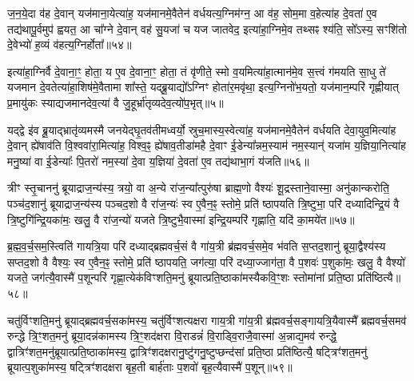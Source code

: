 ज॒न॒ये॒दा व॑ह दे॒वान् यज॑माना॒येत्या॑ह॒ यज॑मानमे॒वैतेन॑ वर्धयत्य॒ग्निम॑ग्न॒ आ व॑ह॒ सोम॒मा व॒हेत्या॑ह दे॒वता॑ ए॒व तद्य॑थापू॒र्वमुप॑ ह्वयत॒ आ चा᳚ग्ने दे॒वान् वह॑ सु॒यजा॑ च यज जातवेद॒ इत्या॑हा॒ग्निमे॒व तथ्सꣴ श्य॑ति॒ सो᳚\-ऽस्य॒ सꣳशि॑तो दे॒वेभ्यो॑ ह॒व्यं व॑हत्य॒ग्निर्\mbox{}होता᳚॥५४॥

इत्या॑हा॒ग्निर्वै दे॒वाना॒ꣳ॒ होता॒ य ए॒व दे॒वाना॒ꣳ॒ होता॒ तं वृ॑णीते॒ स्मो व॒यमित्या॑हा॒त्मान॑मे॒व स॒त्त्वं ग॑मयति सा॒धु ते॑ यजमान दे॒वतेत्या॑हा॒शिष॑मे॒वैतामा शा᳚स्ते॒ यद्ब्रू॒याद्यो᳚\-ऽग्निꣳ होता॑र॒मवृ॑था॒ इत्य॒ग्निनो॑भ॒यतो॒ यज॑मान॒म्परि॑ गृह्णीयात् प्र॒मायु॑कः स्याद्यजमानदेव॒त्या॑ वै जु॒हूर्भ्रा॑तृव्यदेव॒त्यो॑प॒भृत्॥५॥

यद्द्वे इ॑व ब्रू॒याद्भ्रातृ॑व्यमस्मै जनयेद्घृ॒तव॑तीमध्वर्यो॒ स्रुच॒मास्य॒स्वेत्या॑ह॒ यज॑मानमे॒वैतेन॑ वर्धयति देवा॒युव॒मित्या॑ह दे॒वान् ह्ये॑षाव॑ति वि॒श्ववा॑रा॒मित्या॑ह॒ विश्व॒ꣴ॒ ह्ये॑षाव॒तीडा॑महै दे॒वाꣳ ई॒डेन्या᳚न्नम॒स्याम॑ नम॒स्यान्॑ यजा॑म य॒ज्ञिया॒नित्या॑ह मनु॒ष्या॑ वा ई॒डेन्याः᳚ पि॒तरो॑ नम॒स्या॑ दे॒वा य॒ज्ञिया॑ दे॒वता॑ ए॒व तद्य॑थाभा॒गं य॑जति॥५६॥

{\anuvakamend[{विप्रा॑नुमदित॒ इत्या॑ह च॒नास्मै॒ होतो॑प॒भृद्दे॒वता॑ ए॒व त्रीणि॑ च॥९॥}]}

त्रीꣳ स्तृ॒चाननु॑ ब्रूयाद्राज॒न्य॑स्य॒ त्रयो॒ वा अ॒न्ये रा॑ज॒न्या᳚त्पुरु॑षा ब्राह्म॒णो वैश्यः॑ शू॒द्रस्ताने॒वास्मा॒ अनु॑कान्करोति॒ पञ्च॑द॒शानु॑ ब्रूयाद्राज॒न्य॑स्य पञ्चद॒शो वै रा॑ज॒न्यः॑ स्व ए॒वैन॒ꣴ॒ स्तोमे॒ प्रति॑ ष्ठापयति त्रि॒ष्टुभा॒ परि॑ दध्यादिन्द्रि॒यं वै त्रि॒ष्टुगि॑न्द्रि॒यका॑मः॒ खलु॒ वै रा॑ज॒न्यो॑ यजते त्रि॒ष्टुभै॒वास्मा॑ इन्द्रि॒यम्परि॑ गृह्णाति॒ यदि॑ का॒मये॑त॥५७॥

ब्र॒ह्म॒व॒र्च॒सम॒स्त्विति॑ गायत्रि॒या परि॑ दध्याद्ब्रह्मवर्च॒सं वै गा॑य॒त्री ब्र॑ह्मवर्च॒समे॒व भ॑वति स॒प्तद॒शानु॑ ब्रूया॒द्वैश्य॑स्य सप्तद॒शो वै वैश्यः॒ स्व ए॒वैन॒ꣴ॒ स्तोमे॒ प्रति॑ ष्ठापयति॒ जग॑त्या॒ परि॑ दध्या॒ज्जाग॑ता॒ वै प॒शवः॑ प॒शुका॑मः॒ खलु॒ वै वैश्यो॑ यजते॒ जग॑त्यै॒वास्मै॑ प॒शून्परि॑ गृह्णा॒त्येक॑विꣳशति॒मनु॑ ब्रूयात्प्रति॒ष्ठाका॑मस्यैकवि॒ꣳ॒शः स्तोमा॑नां प्रति॒ष्ठा प्रति॑ष्ठित्यै॥५८॥

चतु॑र्विꣳशति॒मनु॑ ब्रूयाद्ब्रह्मवर्च॒सका॑मस्य॒ चतु॑र्विꣳशत्यक्षरा गाय॒त्री गा॑य॒त्री ब्र॑ह्मवर्च॒सङ्गायत्रि॒यैवास्मै᳚ ब्रह्मवर्च॒समव॑ रुन्द्धे त्रि॒ꣳ॒शत॒मनु॑ ब्रूया॒दन्न॑कामस्य त्रि॒ꣳ॒शद॑क्षरा वि॒राडन्नं॑ वि॒राड्वि॒राजै॒वास्मा॑ अ॒न्नाद्य॒मव॑ रुन्द्धे॒ द्वात्रिꣳ॑शत॒मनु॑ब्रूयात्प्रति॒ष्ठाका॑मस्य॒ द्वात्रिꣳ॑शदक्षरानु॒ष्टु॑गनु॒ष्टुप्छन्द॑सां प्रति॒ष्ठा प्रति॑ष्ठित्यै॒ षट्त्रिꣳ॑शत॒मनु॑ ब्रूयात्प॒शुका॑मस्य॒ षट्त्रिꣳ॑शदक्षरा बृह॒ती बार्\mbox{}ह॑ताः प॒शवो॑ बृह॒त्यैवास्मै॑ प॒शून्॥५९॥

